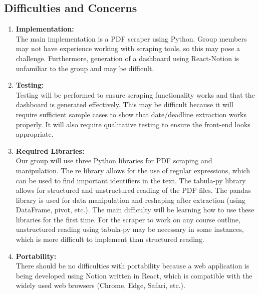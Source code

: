 \documentclass[12pt, titlepage]{article}
\begin{document}
\subsection{Difficulties and Concerns}
\begin{enumerate}
  \item \textbf{Implementation:}\\
The main implementation is a PDF scraper using Python. Group members may not have experience working with scraping tools, so this may pose a challenge. Furthermore, generation of a dashboard using React-Notion is unfamiliar to the group and may be difficult. 
  \item \textbf{Testing:}\\
Testing will be performed to ensure scraping functionality works and that the dashboard is generated effectively. This may be difficult because it will require sufficient sample cases to show that date/deadline extraction works properly. It will also require qualitative testing to ensure the front-end looks appropriate. 
  \item \textbf{Required Libraries:}\\
Our group will use three Python libraries for PDF scraping and manipulation. The re library allows for the use of regular expressions, which can be used to find important identifiers in the text. The tabula-py library allows for structured and unstructured reading of the PDF files. The pandas library is used for data manipulation and reshaping after extraction (using DataFrame, pivot, etc.). The main difficulty will be learning how to use these libraries for the first time. For the scraper to work on any course outline, unstructured reading using tabula-py may be necessary in some instances, which is more difficult to implement than structured reading.
  \item \textbf{Portability:}\\
There should be no difficulties with portability because a web application is being developed using Notion written in React, which is compatible with the widely used web browsers (Chrome, Edge, Safari, etc.). 
\end{enumerate}

\newpage
\end{document}
